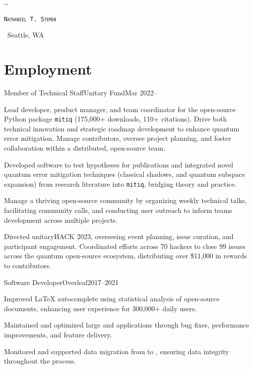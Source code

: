 \documentclass{cultvoucher}
\begin{document}
\begin{adjustwidth}{\dimexpr-\marginparsep-\marginparwidth}{}
	\begin{center}
		\textsc{\texttt{\HUGE Nathaniel T. Stemen}}

		 \separator{}\, Seattle, WA
	\end{center}
\end{adjustwidth}

\section{Employment}

\begin{entry}{Member of Technical Staff}{Unitary Fund}{Mar 2022--}
	\item Lead developer, product manager, and team coordinator for the open-source Python package \texttt{mitiq} (175,000+ downloads, 110+ citations).
		Drive both technical innovation and strategic roadmap development to enhance quantum error mitigation.
		Manage contributors, oversee project planning, and foster collaboration within a distributed, open-source team.
	\item Developed software to test hypotheses for publications and integrated novel quantum error mitigation techniques (classical shadows, and quantum subspace expansion) from research literature into \texttt{mitiq}, bridging theory and practice.
	\item Manage a thriving open-source community by organizing weekly technical talks, facilitating community calls, and conducting user outreach to inform teams development across multiple projects.
    \item Directed unitaryHACK 2023, overseeing event planning, issue curation, and participant engagement.
		Coordinated efforts across 70 hackers to close 99 issues across the quantum open-source ecosystem, distributing over \$11,000 in rewards to contributors.
\end{entry}

\begin{entry}{Software Developer}{Overleaf}{2017--2021}
    \item Improved \LaTeX{} autocomplete using statistical analysis of open-source documents, enhancing user experience for 300,000+ daily users.
    \item Maintained and optimized large  and  applications through bug fixes, performance improvements, and feature delivery.
    \item Monitored and supported data migration from  to , ensuring data integrity throughout the process.
\end{entry}
\end{document}
